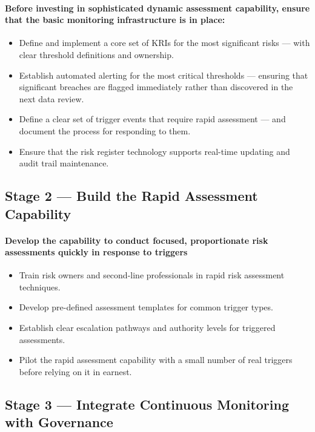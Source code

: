 \paragraph{Before investing in sophisticated dynamic assessment capability, ensure that the basic monitoring infrastructure is in place:}
\begin{itemize}
  \item{Define and implement a core set of KRIs for the most significant risks — with clear threshold definitions and ownership.}
  \item{Establish automated alerting for the most critical thresholds — ensuring that significant breaches are flagged immediately rather than discovered in the next data review.}
  \item{Define a clear set of trigger events that require rapid assessment — and document the process for responding to them.}
  \item{Ensure that the risk register technology supports real-time updating and audit trail maintenance.}
\end{itemize}

\subsection{Stage 2 — Build the Rapid Assessment Capability}
\paragraph{Develop the capability to conduct focused, proportionate risk assessments quickly in response to triggers}
\begin{itemize}
  \item{Train risk owners and second-line professionals in rapid risk assessment techniques.}
  \item{Develop pre-defined assessment templates for common trigger types.}
  \item{Establish clear escalation pathways and authority levels for triggered assessments.}
  \item{Pilot the rapid assessment capability with a small number of real triggers before relying on it in earnest.}
\end{itemize}

\subsection{Stage 3 — Integrate Continuous Monitoring with Governance}
